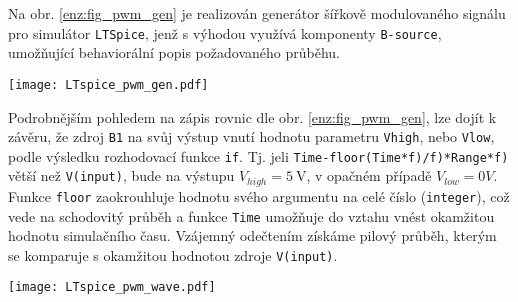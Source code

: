 \begin{example}\label{AES:exam003}
  Na obr. \ref{enz:fig_pwm_gen} je realizován generátor šířkově modulovaného signálu pro
  simulátor \texttt{LTSpice}, jenž s výhodou využívá komponenty \texttt{B-source}, umožňující
  behaviorální popis požadovaného průběhu.

   {\centering
    \captionsetup{type=figure} 
    \texttt{[image: LTspice\_pwm\_gen.pdf]}
    \label{enz:fig_pwm_gen}
  \par}
  Podrobnějším pohledem na zápis rovnic dle obr. \ref{enz:fig_pwm_gen}, lze dojít k závěru, že
  zdroj \texttt{B1} na svůj výstup vnutí hodnotu parametru \texttt{Vhigh}, nebo \texttt{Vlow},
  podle výsledku rozhodovací funkce \texttt{if}. Tj. jeli \texttt{Time-floor(Time*f)/f)*Range*f)} 
  větší než \texttt{V(input)}, bude na výstupu $V_{high}= \qty{5}{\volt}$, v opačném případě 
  $V_{low} = 0V$. Funkce \texttt{floor} zaokrouhluje hodnotu svého argumentu na celé číslo 
  (\texttt{integer}), což vede na schodovitý průběh a funkce \texttt{Time} umožňuje do vztahu vnést 
  okamžitou hodnotu simulačního času. Vzájemný odečtením získáme pilový průběh, kterým se komparuje 
  s okamžitou hodnotou zdroje \texttt{V(input)}.

    {\centering
     \captionsetup{type=figure} 
     \texttt{[image: LTspice\_pwm\_wave.pdf]}
     \label{enz:fig_pwm_wave}
   \par}       
\end{example} 